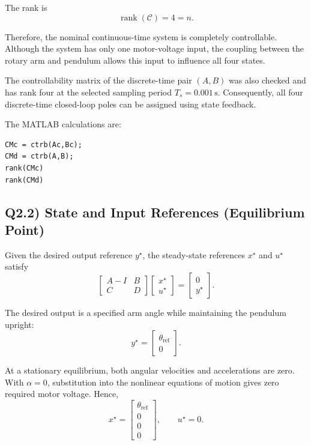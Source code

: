 \documentclass[11pt,a4paper]{article}
\begin{document}
The rank is
\begin{equation}
    \operatorname{rank}(\mathcal{C}) = 4 = n.
\end{equation}

Therefore, the nominal continuous-time system is completely controllable. Although the system has only one motor-voltage input, the coupling between the rotary arm and pendulum allows this input to influence all four states.

The controllability matrix of the discrete-time pair $(A,B)$ was also checked and has rank four at the selected sampling period $T_s=0.001\,\mathrm{s}$. Consequently, all four discrete-time closed-loop poles can be assigned using state feedback.

The MATLAB calculations are:
\begin{verbatim}
CMc = ctrb(Ac,Bc);
CMd = ctrb(A,B);
rank(CMc)
rank(CMd)
\end{verbatim}

\subsection*{Q2.2) State and Input References (Equilibrium Point)}
Given the desired output reference $y^\star$, the steady-state references
$x^\star$ and $u^\star$ satisfy
\begin{equation}
  \begin{bmatrix} A - I & B\\ C & D\end{bmatrix}
  \begin{bmatrix} x^\star\\ u^\star\end{bmatrix}
  = \begin{bmatrix} 0\\ y^\star\end{bmatrix}.
\end{equation}

The desired output is a specified arm angle while maintaining the pendulum upright:
\begin{equation}
    y^\star =
    \begin{bmatrix}
        \theta_{\mathrm{ref}} \\ 0
    \end{bmatrix}.
\end{equation}

At a stationary equilibrium, both angular velocities and accelerations are zero. With $\alpha=0$, substitution into the nonlinear equations of motion gives zero required motor voltage. Hence,
\begin{equation}
    x^\star =
    \begin{bmatrix}
        \theta_{\mathrm{ref}} \\ 0 \\ 0 \\ 0
    \end{bmatrix},
    \qquad
    u^\star = 0.
\end{equation}
\end{document}
